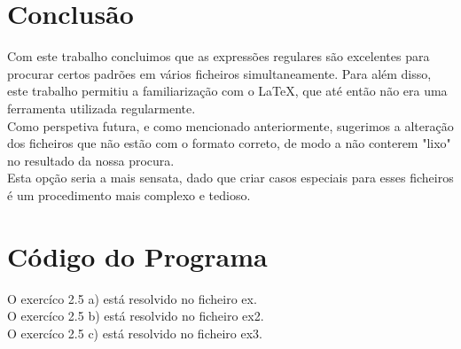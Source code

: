 \documentclass{report}
\begin{document}


\chapter{Conclusão} \label{concl}
Com este trabalho concluimos que as expressões regulares são excelentes para procurar certos padrões em vários ficheiros simultaneamente.
Para além disso, este trabalho permitiu a familiarização com o \LaTeX, que até então não era uma ferramenta utilizada regularmente.\\
Como perspetiva futura, e como mencionado anteriormente, sugerimos a alteração dos ficheiros que não estão com o formato correto, de modo a não conterem "lixo" no resultado da nossa procura.\\
Esta opção seria a mais sensata, dado que criar casos especiais para esses ficheiros é um procedimento mais complexo e tedioso.



\chapter{Código do Programa}

O exercíco 2.5 a) está resolvido no ficheiro ex.\\
O exercíco 2.5 b) está resolvido no ficheiro ex2.\\
O exercíco 2.5 c) está resolvido no ficheiro ex3.\\
\end{document}
